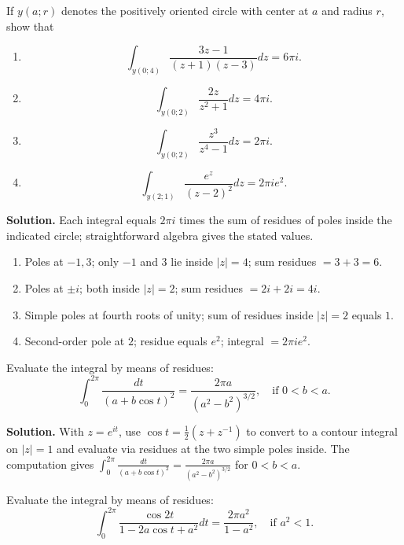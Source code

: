 \begin{problembox}
If \( y(a; r) \) denotes the positively oriented circle with center at \( a \) and radius \( r \), show that
\begin{enumerate}[label=(\alph*)]
\item \[ \int_{y(0;4)} \frac{3z - 1}{(z + 1)(z - 3)} dz = 6\pi i. \]
\item \[ \int_{y(0;2)} \frac{2z}{z^2 + 1} dz = 4\pi i. \]
\item \[ \int_{y(0;2)} \frac{z^3}{z^4 - 1} dz = 2\pi i. \]
\item \[ \int_{y(2;1)} \frac{e^z}{(z - 2)^2} dz = 2\pi ie^2. \]
\end{enumerate}
\end{problembox}

\noindent\textbf{Solution.}
Each integral equals $2\pi i$ times the sum of residues of poles inside the indicated circle; straightforward algebra gives the stated values.
\begin{enumerate}[label=(\alph*)]
\item Poles at $-1,3$; only $-1$ and $3$ lie inside $|z|=4$; sum residues $=3+3=6$.
\item Poles at $\pm i$; both inside $|z|=2$; sum residues $=2i+2i=4i$.
\item Simple poles at fourth roots of unity; sum of residues inside $|z|=2$ equals $1$.
\item Second-order pole at $2$; residue equals $e^2$; integral $=2\pi i e^2$.
\end{enumerate}

\begin{problembox}
Evaluate the integral by means of residues:
\[ \int_0^{2\pi} \frac{dt}{(a + b \cos t)^2} = \frac{2\pi a}{(a^2 - b^2)^{3/2}}, \quad \text{if } 0 < b < a. \]
\end{problembox}

\noindent\textbf{Solution.}
With $z=e^{it}$, use $\cos t=\tfrac12(z+z^{-1})$ to convert to a contour integral on $|z|=1$ and evaluate via residues at the two simple poles inside. The computation gives $\int_0^{2\pi}\frac{dt}{(a+b\cos t)^2}=\frac{2\pi a}{(a^2-b^2)^{3/2}}$ for $0<b<a$.

\begin{problembox}
Evaluate the integral by means of residues:
\[ \int_0^{2\pi} \frac{\cos 2t}{1 - 2a \cos t + a^2} dt = \frac{2\pi a^2}{1 - a^2}, \quad \text{if } a^2 < 1. \]
\end{problembox}


